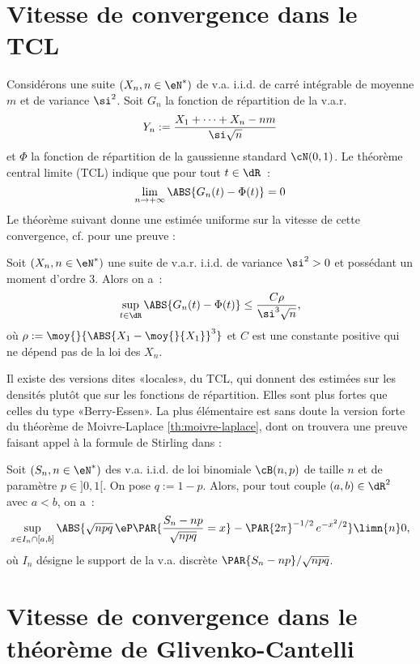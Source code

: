 %
\section{Vitesse de convergence dans le TCL}
%

Considérons une suite $(X_n,n\in\eN^*)$ de v.a. i.i.d. de carré intégrable de
moyenne $m$ et de variance $\si^2$. Soit $G_n$ la fonction de répartition de
la v.a.r.
$$
Y_n:=\frac{X_1+\cdots+X_n-nm}{\si\sqrt{n}}
$$
et $\Phi$ la fonction de répartition de la gaussienne standard $\cN(0,1)$. Le
théorème central limite (TCL) indique que pour tout $t\in\dR$~:
$$
\lim_{n\to+\infty}\ABS{G_n(t)-\Phi(t)}=0
$$
Le théorème suivant donne une estimée uniforme sur la vitesse de cette
convergence, cf. \cite{petrov} pour une preuve :

\begin{theorem}
  Soit $(X_n,n\in\eN^*)$ une suite de v.a.r. i.i.d. de variance $\si^2>0$ et
  possédant un moment d'ordre $3$. Alors on a~:
  $$
  \sup_{t\in\dR}\ABS{G_n(t)-\Phi(t)} \leq \frac{C\rho}{\si^3\sqrt{n}},
  $$
  où $\rho:=\moy{}{\ABS{X_1-\moy{}{X_1}}^3}$ et $C$ est une constante positive qui ne
  dépend pas de la loi des $X_n$.
\end{theorem}

Il existe des versions dites «locales», du TCL, qui donnent des estimées sur
les densités plutôt que sur les fonctions de répartition. Elles sont plus
fortes que celles du type «Berry-Essen».  La plus élémentaire est sans doute
la version forte du théorème de Moivre-Laplace \ref{th:moivre-laplace}, dont
on trouvera une preuve faisant appel à la formule de Stirling dans \cite[thm
2.2.4 page 35]{dacunha-castelle-duflo} :

\begin{theorem}\label{th:moivre-laplace-fort}
  Soit $(S_n,n\in\eN^*)$ des v.a. i.i.d. de loi binomiale $\cB(n,p)$ de taille
  $n$ et de paramètre $p\in]0,1[$. On pose $q:=1-p$. Alors, pour tout couple
  $(a,b)\in\dR^2$ avec $a<b$, on a~:
  $$
  \sup_{x\in I_n\cap[a,b]}
  \ABS{\sqrt{npq}\,\eP\PAR{\frac{S_n-np}{\sqrt{npq}}=x}-\PAR{2\pi}^{-1/2}\,e^{-x^2/2}}
  \limn{n} 0,
  $$
  où $I_n$ désigne le support de la v.a. discrète $\PAR{S_n-np}/\sqrt{npq}$.
\end{theorem}

%
\section{Vitesse de convergence dans le théorème de Glivenko-Cantelli}
\label{se:vitesse-tgc}
%

